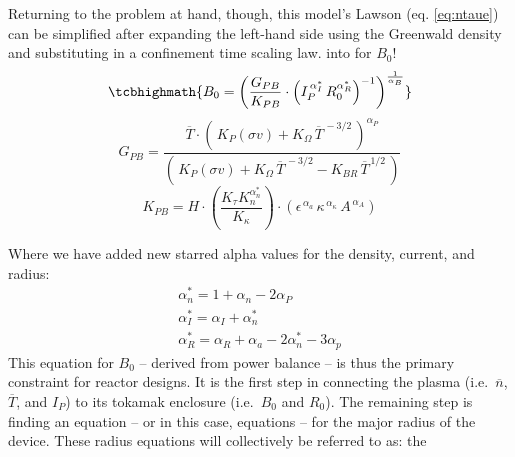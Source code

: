 Returning to the problem at hand, though, this model's Lawson  (eq. \ref{eq:ntaue}) can be simplified after expanding the left-hand side using the Greenwald density and substituting in a confinement time scaling law.  into  for $B_0$!
\begin{equation}
	\label{eq:b_0_power}
	\tcbhighmath{
	B_0 = \left( \frac{ G_{PB} }{ K_{PB} } \cdot \left( I_P^{\,\alpha_I^*} \, R_0^{ \alpha_R^* } \right)^{-1} \right) ^ { \frac{1}{ \alpha_B } }
	}
\end{equation}
\begin{equation}
	G_{PB} = \frac{ \overline{T} \cdot \left( \, K_P (\sigma v) + K_\Omega  \, \overline{T}^{  \,-3/2 } \, \right) ^ { \alpha_P } }{ \left( \, K_P (\sigma v) + K_\Omega  \, \overline{T}^{  \,-3/2 } - K_{BR} \, \overline{T}^{  \,1/2 } \, \right) }
\end{equation}
\begin{equation}
	K_{PB} = H \cdot \left( \frac{ K_\tau K_n^{\alpha_n^*}}{K_\kappa } \right) \cdot \left(
     \epsilon^{\,\alpha_a} \, \kappa^{\,\alpha_\kappa} \, A^{\,\alpha_A}\right)
\end{equation}

Where we have added new starred alpha values for the density, current, and radius:
\begin{gather}
  \alpha_n^* = 1 + \alpha_n - 2 \alpha_P \\
  \alpha_I^* = \alpha_I + \alpha_n^* \\
  \alpha_R^* = \alpha_R + \alpha_a - 2  \alpha_n^* - 3 \alpha_p
\end{gather}
This equation for $B_0$ -- derived from power balance -- is thus the primary constraint for reactor designs. It is the first step in connecting the plasma (i.e.\ $\overline n$, $\overline T$, and $I_P$) to its tokamak enclosure (i.e.\ $B_0$ and $R_0$). The remaining step is finding an equation -- or in this case, equations -- for the major radius of the device. These radius equations will collectively be referred to as: the 

